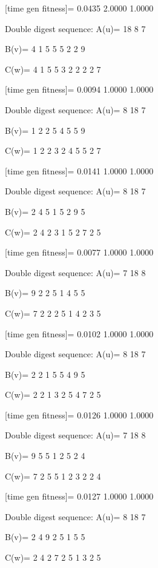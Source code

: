 [time gen fitness]=
    0.0435    2.0000    1.0000

Double digest sequence:
A(u)=
    18     8     7

B(v)=
     4     1     5     5     5     2     2     9

C(w)=
     4     1     5     5     3     2     2     2     2     7

[time gen fitness]=
    0.0094    1.0000    1.0000

Double digest sequence:
A(u)=
     8    18     7

B(v)=
     1     2     2     5     4     5     5     9

C(w)=
     1     2     2     3     2     4     5     5     2     7

[time gen fitness]=
    0.0141    1.0000    1.0000

Double digest sequence:
A(u)=
     8    18     7

B(v)=
     2     4     5     1     5     2     9     5

C(w)=
     2     4     2     3     1     5     2     7     2     5

[time gen fitness]=
    0.0077    1.0000    1.0000

Double digest sequence:
A(u)=
     7    18     8

B(v)=
     9     2     2     5     1     4     5     5

C(w)=
     7     2     2     2     5     1     4     2     3     5

[time gen fitness]=
    0.0102    1.0000    1.0000

Double digest sequence:
A(u)=
     8    18     7

B(v)=
     2     2     1     5     5     4     9     5

C(w)=
     2     2     1     3     2     5     4     7     2     5

[time gen fitness]=
    0.0126    1.0000    1.0000

Double digest sequence:
A(u)=
     7    18     8

B(v)=
     9     5     5     1     2     5     2     4

C(w)=
     7     2     5     5     1     2     3     2     2     4

[time gen fitness]=
    0.0127    1.0000    1.0000

Double digest sequence:
A(u)=
     8    18     7

B(v)=
     2     4     9     2     5     1     5     5

C(w)=
     2     4     2     7     2     5     1     3     2     5

